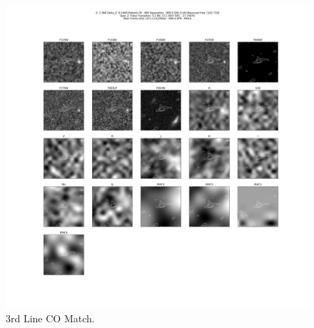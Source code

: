 \begin{figure}[tbp]
\centering \includegraphics[width=120mm]{Matched/ASPECS_Cutout_3.png}
\caption{3rd Line CO Match.}
\label{fig:Match_Three}
\end{figure}
